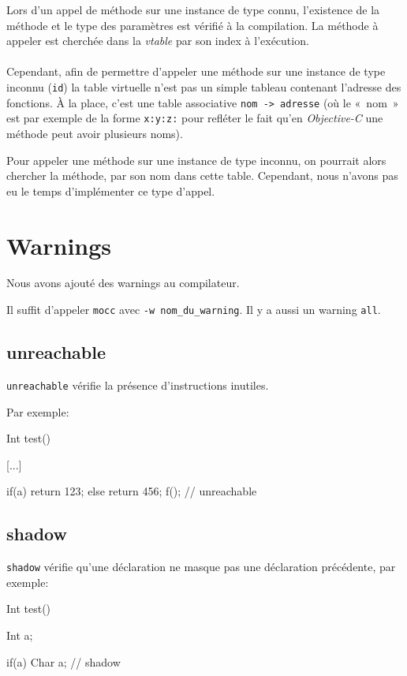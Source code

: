 \documentclass{scrartcl}
\newcommand{\mocc}{\texttt{mocc}}
\newcommand{\objc}{\textit{Objective-C}}
\begin{document}
      Lors d'un appel de méthode sur une instance de type connu, l'existence de
      la méthode et le type des paramètres est vérifié à la compilation. La
      méthode à appeler est cherchée dans la \textit{vtable} par son index à
      l'exécution.

      \paragraph{}
      Cependant, afin de permettre d'appeler une méthode sur une instance de
      type inconnu (\verb+id+) la table virtuelle n'est pas un simple tableau
      contenant l'adresse des fonctions. À la place, c'est une table
      associative \verb+nom -> adresse+ (où le «~nom~» est par exemple de la
      forme \verb+x:y:z:+ pour refléter le fait qu'en \objc{} une méthode peut
      avoir plusieurs noms).

      Pour appeler une méthode sur une instance de type inconnu, on pourrait
      alors chercher la méthode, par son nom dans cette table. Cependant, nous
      n'avons pas eu le temps d'implémenter ce type d'appel.

\section{Warnings}\label{sec:warnings}
  Nous avons ajouté des warnings au compilateur.

  Il suffit d'appeler \mocc{} avec \verb+-w nom_du_warning+.
  Il y a aussi un warning \verb+all+.

  \subsection{unreachable}
    \verb"unreachable" vérifie la présence d'instructions inutiles.

    Par exemple:
    \begin{moccode}
Int test() {
    [...]

    if(a) {
        return 123;
    }
    else {
        return 456;
    }
    f(); // unreachable
}
    \end{moccode}

  \subsection{shadow}
    \verb"shadow" vérifie qu'une déclaration ne masque pas une déclaration
    précédente, par exemple:
    \begin{moccode}
Int test() {
    Int a;

    if(a) {
        Char a; // shadow
    }
}
    \end{moccode}
\end{document}
